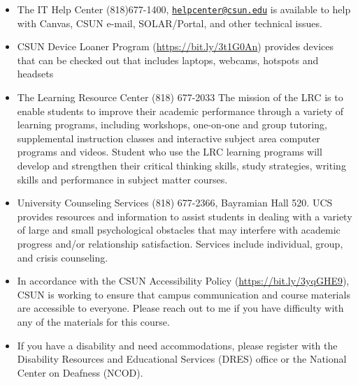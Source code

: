\documentclass[11pt,]{article}
\providecommand{\tightlist}{%
  \setlength{\itemsep}{0pt}\setlength{\parskip}{0pt}}
\begin{document}
\begin{itemize}
\tightlist
\item
  The IT Help Center (818)677-1400,
  \href{mailto:helpcenter@csun.edu}{\nolinkurl{helpcenter@csun.edu}} is
  available to help with Canvas, CSUN e-mail, SOLAR/Portal, and other
  technical issues.\\
\item
  CSUN Device Loaner Program (\url{https://bit.ly/3t1G0An}) provides
  devices that can be checked out that includes laptops, webcams,
  hotspots and headsets
\item
  The Learning Resource Center (818) 677-2033 The mission of the LRC is
  to enable students to improve their academic performance through a
  variety of learning programs, including workshops, one-on-one and
  group tutoring, supplemental instruction classes and interactive
  subject area computer programs and videos. Student who use the LRC
  learning programs will develop and strengthen their critical thinking
  skills, study strategies, writing skills and performance in subject
  matter courses.
\item
  University Counseling Services (818) 677-2366, Bayramian Hall 520. UCS
  provides resources and information to assist students in dealing with
  a variety of large and small psychological obstacles that may
  interfere with academic progress and/or relationship satisfaction.
  Services include individual, group, and crisis counseling.
\item
  In accordance with the CSUN Accessibility Policy
  (\url{https://bit.ly/3yqGHE9}), CSUN is working to ensure that campus
  communication and course materials are accessible to everyone. Please
  reach out to me if you have difficulty with any of the materials for
  this course.
\item
  If you have a disability and need accommodations, please register with
  the Disability Resources and Educational Services (DRES) office or the
  National Center on Deafness (NCOD).


\end{itemize}
\end{document}
